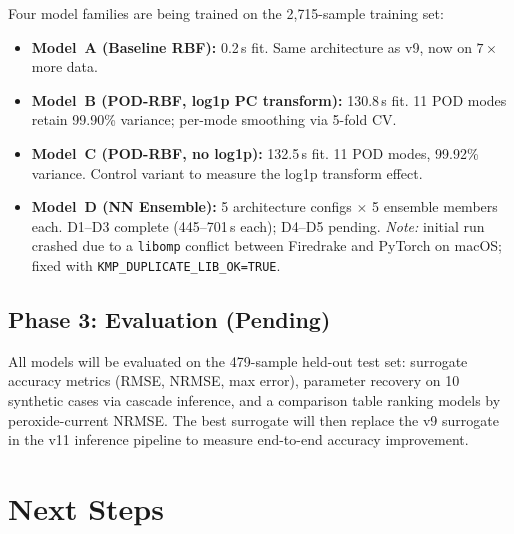 \documentclass[11pt]{article}
\begin{document}
Four model families are being trained on the 2{,}715-sample training set:
\begin{itemize}
  \item \textbf{Model~A (Baseline RBF):} 0.2\,s fit.  Same architecture as v9,
        now on $7\times$ more data.
  \item \textbf{Model~B (POD-RBF, log1p PC transform):} 130.8\,s fit.
        11 POD modes retain 99.90\% variance; per-mode smoothing via 5-fold CV.
  \item \textbf{Model~C (POD-RBF, no log1p):} 132.5\,s fit.
        11 POD modes, 99.92\% variance.  Control variant to measure
        the log1p transform effect.
  \item \textbf{Model~D (NN Ensemble):} 5 architecture configs $\times$ 5
        ensemble members each.  D1--D3 complete (445--701\,s each);
        D4--D5 pending.
        \emph{Note:} initial run crashed due to a \texttt{libomp} conflict
        between Firedrake and PyTorch on macOS; fixed with
        \texttt{KMP\_DUPLICATE\_LIB\_OK=TRUE}.
\end{itemize}

\subsection{Phase 3: Evaluation (Pending)}

All models will be evaluated on the 479-sample held-out test set:
surrogate accuracy metrics (RMSE, NRMSE, max error), parameter recovery
on 10 synthetic cases via cascade inference, and a comparison table
ranking models by peroxide-current NRMSE.  The best surrogate will then
replace the v9 surrogate in the v11 inference pipeline to measure
end-to-end accuracy improvement.


\section{Next Steps}
\end{document}
